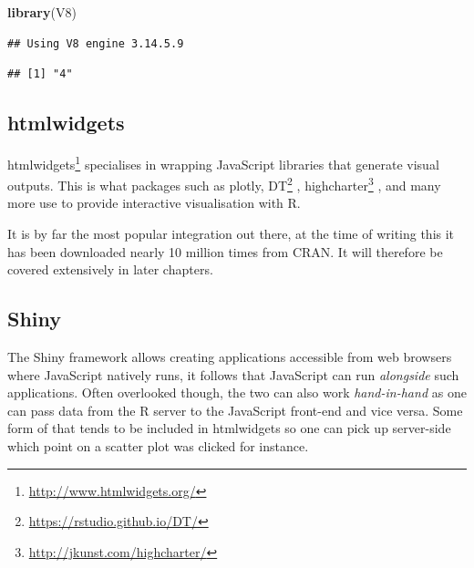 \documentclass[
]{krantz}
\makeatletter
\newenvironment{Shaded}{\begin{snugshade}}{\end{snugshade}}
\newcommand{\CommentTok}[1]{\textcolor[rgb]{0.37,0.37,0.37}{\textit{#1}}}
\newcommand{\KeywordTok}[1]{\textcolor[rgb]{0.27,0.27,0.27}{\textbf{#1}}}
\newcommand{\NormalTok}[1]{#1}
\newcommand{\OperatorTok}[1]{\textcolor[rgb]{0.43,0.43,0.43}{\textbf{#1}}}
\newcommand{\StringTok}[1]{\textcolor[rgb]{0.5,0.5,0.5}{#1}}
\renewcommand{\href}[2]{#2\footnote{\url{#1}}}
\newenvironment{kframe}{%
\medskip{}
\setlength{\fboxsep}{.8em}
 \def\at@end@of@kframe{}%
 \ifinner\ifhmode%
  \def\at@end@of@kframe{\end{minipage}}%
  \begin{minipage}{\columnwidth}%
 \fi\fi%
 \def\FrameCommand##1{\hskip\@totalleftmargin \hskip-\fboxsep
 \colorbox{shadecolor}{##1}\hskip-\fboxsep
     \hskip-\linewidth \hskip-\@totalleftmargin \hskip\columnwidth}%
 \MakeFramed {\advance\hsize-\width
   \@totalleftmargin\z@ \linewidth\hsize
   \@setminipage}}%
 {\par\unskip\endMakeFramed%
 \at@end@of@kframe}
\renewenvironment{Shaded}{\begin{kframe}}{\end{kframe}}
\makeatother
\begin{document}
\begin{Shaded}
\begin{Highlighting}[]
\KeywordTok{library}\NormalTok{(V8)}
\end{Highlighting}
\end{Shaded}

\begin{verbatim}
## Using V8 engine 3.14.5.9
\end{verbatim}

\begin{Shaded}
\end{Shaded}

\begin{verbatim}
## [1] "4"
\end{verbatim}

\hypertarget{htmlwidgets}{%
\subsection*{htmlwidgets}\label{htmlwidgets}}


\href{http://www.htmlwidgets.org/}{htmlwidgets} \citep{R-htmlwidgets} specialises in wrapping JavaScript libraries that generate visual outputs. This is what packages such as plotly, \href{https://rstudio.github.io/DT/}{DT} \citep{R-DT}, \href{http://jkunst.com/highcharter/}{highcharter} \citep{R-highcharter}, and many more use to provide interactive visualisation with R.

It is by far the most popular integration out there, at the time of writing this it has been downloaded nearly 10 million times from CRAN. It will therefore be covered extensively in later chapters.

\hypertarget{shiny}{%
\subsection*{Shiny}\label{shiny}}


The Shiny framework allows creating applications accessible from web browsers where JavaScript natively runs, it follows that JavaScript can run \emph{alongside} such applications. Often overlooked though, the two can also work \emph{hand-in-hand} as one can pass data from the R server to the JavaScript front-end and vice versa. Some form of that tends to be included in htmlwidgets so one can pick up server-side which point on a scatter plot was clicked for instance.
\end{document}
